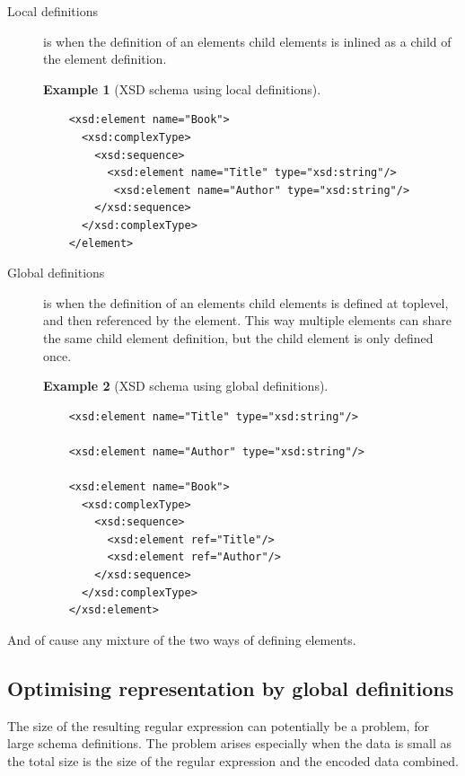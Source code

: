 \documentclass[a4paper, oneside]{memoir}
\theoremstyle{definition}
\newtheorem{example}{Example}
\begin{document}
\begin{description}
\item[Local definitions] is when the definition of an elements child elements is
  inlined as a child of the element definition. 

  \begin{example}[XSD schema using local definitions] \ %
\begin{verbatim}
    <xsd:element name="Book"> 
      <xsd:complexType> 
        <xsd:sequence> 
          <xsd:element name="Title" type="xsd:string"/> 
           <xsd:element name="Author" type="xsd:string"/> 
        </xsd:sequence> 
      </xsd:complexType> 
    </element>
\end{verbatim}
  \end{example}

\item[Global definitions] is when the definition of an elements child elements
  is defined at toplevel, and then referenced by the element. This way multiple
  elements can share the same child element definition, but the child element is
  only defined once.

  \begin{example}[XSD schema using global definitions] \ %
\begin{verbatim}
    <xsd:element name="Title" type="xsd:string"/>

    <xsd:element name="Author" type="xsd:string"/>

    <xsd:element name="Book">
      <xsd:complexType> 
        <xsd:sequence> 
          <xsd:element ref="Title"/> 
          <xsd:element ref="Author"/>
        </xsd:sequence> 
      </xsd:complexType> 
    </xsd:element>
\end{verbatim}
  \end{example}

\end{description}

And of cause any mixture of the two ways of defining elements.

\subsection{Optimising representation by global definitions}

The size of the resulting regular expression can potentially be a problem, for
large schema definitions. The problem arises especially when the data is small
as the total size is the size of the regular expression and the encoded data
combined.
\end{document}
